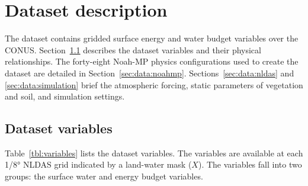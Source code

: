 \documentclass[essd]{copernicus}
\begin{document}
\section{Dataset description} \label{sec:data}

The dataset contains gridded surface energy and water budget variables over the
CONUS. Section~\ref{sec:data:variables} describes the dataset variables and
their physical relationships. The forty-eight Noah-MP physics configurations
used to create the dataset are detailed in Section~\ref{sec:data:noahmp}.
Sections~\ref{sec:data:nldas} and \ref{sec:data:simulation} brief the
atmospheric forcing, static parameters of vegetation and soil, and simulation
settings.


\subsection{Dataset variables} \label{sec:data:variables}

Table~\ref{tbl:variables} lists the dataset variables. The variables are
available at each 1/8° NLDAS grid indicated by a land-water mask
($X$). The variables fall into two groups: the surface water and energy budget
variables.
\end{document}
